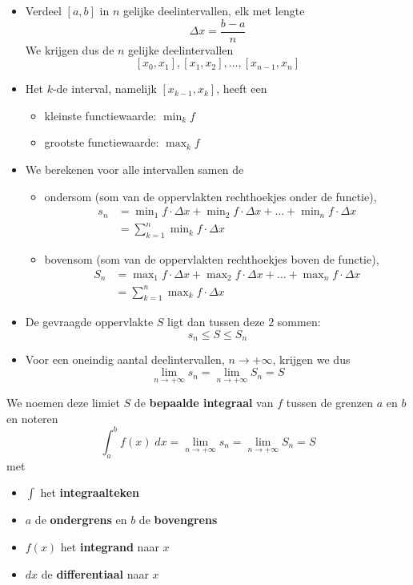 \documentclass[a4paper,12pt, twoside]{article}
\begin{document}
\begin{itemize}
  \item Verdeel $[a,b]$ in $n$ gelijke deelintervallen, elk met lengte
  $$\Delta x=\dfrac{b-a}{n}$$
  We krijgen dus de $n$ gelijke deelintervallen
  $$[x_0, x_1],[x_1, x_2],\ldots,[x_{n-1}, x_{n}]$$
  \item Het $k$-de interval, namelijk $[x_{k-1},x_{k}]$, heeft een
  \begin{itemize}
    \item kleinste functiewaarde: $\min_k f$
    \item grootste functiewaarde: $\max_k f$
  \end{itemize}
  \item We berekenen voor alle intervallen samen de
  \begin{itemize}
    \item ondersom (som van de oppervlakten rechthoekjes onder de functie),
    \begin{align*}
      s_n &= \min\nolimits_1 f\cdot \Delta x + \min\nolimits_2 f\cdot \Delta x + \ldots + \min\nolimits_n f\cdot \Delta x\\
          &= \sum_{k=1}^n \min\nolimits_k f\cdot\Delta x
    \end{align*}
    \item bovensom (som van de oppervlakten rechthoekjes boven de functie),
    \begin{align*}
      S_n &= \max\nolimits_1 f\cdot \Delta x + \max\nolimits_2 f\cdot \Delta x + \ldots + \max\nolimits_n f\cdot \Delta x\\
          &= \sum_{k=1}^n \max\nolimits_k f\cdot\Delta x
    \end{align*}
  \end{itemize}
  \item De gevraagde oppervlakte $S$ ligt dan tussen deze 2 sommen:
  $$s_n \leq S \leq S_n$$
  \item Voor een oneindig aantal deelintervallen, $n\to+\infty$, krijgen we dus
  $$\lim_{n\to+\infty}s_n = \lim_{n\to+\infty}S_n = S$$
\end{itemize}

We noemen deze limiet $S$ de {\bf bepaalde integraal} van $f$ tussen de grenzen $a$ en $b$ en noteren
$$\int_a^b f(x)\;dx = \lim_{n\to+\infty}s_n = \lim_{n\to+\infty}S_n = S$$
met
\begin{itemize}
  \item $\displaystyle\int$ het {\bf integraalteken}
  \item $a$ de {\bf ondergrens} en $b$ de {\bf bovengrens}
  \item $f(x)$ het {\bf integrand} naar $x$
  \item $dx$ de {\bf differentiaal} naar $x$
\end{itemize}
\end{document}
